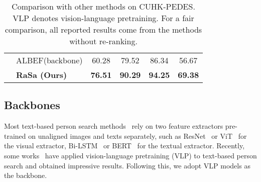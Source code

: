 \documentclass{article}
\begin{document}
\begin{table}[t]
\begin{tabular}{c|l|cccc}
\cline{2-6}
                                               & ALBEF(backbone) \cite{NEURIPS2021_50525975}& 60.28     & 79.52      & 86.34      & 56.67           \\
                                               & \textbf{RaSa (Ours)}        & \textbf{76.51}    & \textbf{90.29}    & \textbf{94.25}    & \textbf{69.38} \\
\hline
\end{tabular}
\caption{Comparison with other methods on CUHK-PEDES. VLP denotes vision-language pretraining. For a fair comparison, all reported results come from the methods without re-ranking.}
\label{table1}
\end{table}


\iffalse
\subsection{Implementation Details}
All experiments are conducted on $4$ NVIDIA $3090$ GPUs.
We train our model with $30$ epochs and a batch size of $52$. 
The AdamW optimizer~\cite{loshchilov2018decoupled} is adopted with a weight decay of $0.02$. 
The learning rate is initialized as $1e-4$ for the parameters of the classifiers in PRD and $m$-RTD, and $1e-5$ for the rest parameters of the model.
All images are resized to $384\times384$ and random horizontal flipping is employed for data augmentation.
The input texts are set with a maximum length of $50$ for all datasets.
The momentum coefficient in the momentum model is set as $m=0.995$.
The queue size $R$ is set as $65,536$ and the temperature $\tau$ is set as $0.07$ in CL.
The probability of inputting the weak positive pair is set as $p^{w}=0.1$ in RA, and the probability of masking the word in the text is set as $p^{m}=0.3$ in SA.
The hyper-parameters in the objective function are set as $\lambda_1=0.5$, $\lambda_2=0.5$, $\lambda_3=0.5$.  
\fi

\subsection{Backbones}
\label{Baselines}




Most text-based person search methods~\cite{li2022learning,shao2022learning} rely on two feature extractors pre-trained on unaligned images and texts separately, such as ResNet~\cite{he2016deep} or ViT~\cite{dosovitskiy2020image} for the visual extractor, Bi-LSTM~\cite{hochreiter1997long} or BERT~\cite{devlin2018bert} for the textual extractor. 
Recently, some works~\cite{shu2022see,yan2022clip} have applied vision-language pretraining (VLP) to text-based person search and obtained impressive results. 
Following this, we adopt VLP models as the backbone.
\end{document}
